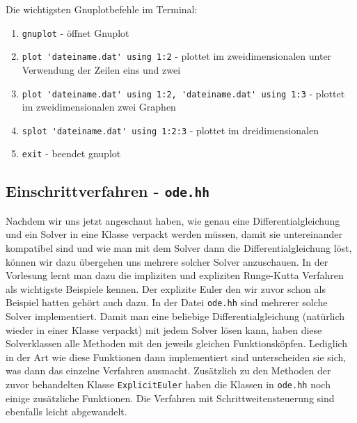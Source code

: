 \documentclass[a4paper,11pt]{article}
\theoremstyle{definition}
\begin{document}
Die wichtigsten Gnuplotbefehle im Terminal:
\begin{enumerate}
\item \lstinline{gnuplot} - öffnet Gnuplot
\item \lstinline{plot 'dateiname.dat' using 1:2} - plottet im zweidimensionalen unter Verwendung der Zeilen eins und zwei
\item \lstinline{plot 'dateiname.dat' using 1:2, 'dateiname.dat' using 1:3} - plottet im zweidimensionalen zwei Graphen
\item \lstinline{splot 'dateiname.dat' using 1:2:3} - plottet im dreidimensionalen
\item \lstinline{exit} - beendet gnuplot
\end{enumerate}




\subsection{Einschrittverfahren - \lstinline{ode.hh}}
Nachdem wir uns jetzt angeschaut haben, wie genau eine Differentialgleichung und ein Solver in eine Klasse verpackt werden müssen, damit sie untereinander kompatibel sind und wie man mit dem Solver dann die Differentialgleichung löst, können wir dazu übergehen uns mehrere solcher Solver anzuschauen. In der Vorlesung lernt man dazu die impliziten und expliziten Runge-Kutta Verfahren als wichtigste Beispiele kennen. Der explizite Euler den wir zuvor schon als Beispiel hatten gehört auch dazu. In der Datei \lstinline{ode.hh} sind mehrerer solche Solver implementiert. Damit man eine beliebige Differentialgleichung (natürlich wieder in einer Klasse verpackt) mit jedem Solver lösen kann, haben diese Solverklassen alle Methoden mit den jeweils gleichen Funktionsköpfen. Lediglich in der Art wie diese Funktionen dann implementiert sind unterscheiden sie sich, was dann das einzelne Verfahren ausmacht. 
Zusätzlich zu den Methoden der zuvor behandelten Klasse \lstinline{ExplicitEuler} haben die Klassen in \lstinline{ode.hh} noch einige zusätzliche Funktionen. Die Verfahren mit Schrittweitensteuerung sind ebenfalls leicht abgewandelt.
\end{document}
